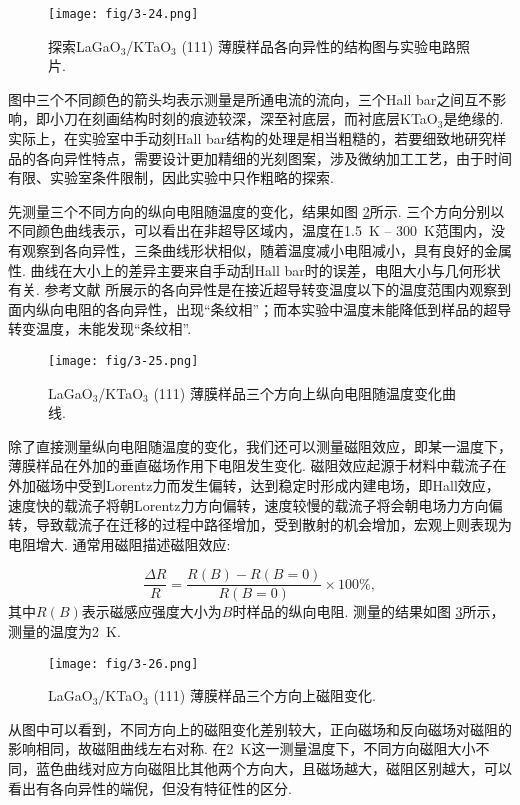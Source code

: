 \documentclass[12pt,a4paper,openany,twoside,UTF-8]{book}
\begin{document}
\begin{figure}[htbp]
\centering
\texttt{[image: fig/3-24.png]}
\caption{探索LaGaO$_3$/KTaO$_3$ (111) 薄膜样品各向异性的结构图与实验电路照片.}
\label{fig:3-24} 
\end{figure}

图中三个不同颜色的箭头均表示测量是所通电流的流向，三个Hall bar之间互不影响，即小刀在刻画结构时刻的痕迹较深，深至衬底层，而衬底层KTaO$_3$是绝缘的. 实际上，在实验室中手动刻Hall bar结构的处理是相当粗糙的，若要细致地研究样品的各向异性特点，需要设计更加精细的光刻图案，涉及微纳加工工艺，由于时间有限、实验室条件限制，因此实验中只作粗略的探索.

先测量三个不同方向的纵向电阻随温度的变化，结果如图 \ref{fig:3-25}所示. 三个方向分别以不同颜色曲线表示，可以看出在非超导区域内，温度在\SI{1.5}{K} – \SI{300}{K}范围内，没有观察到各向异性，三条曲线形状相似，随着温度减小电阻减小，具有良好的金属性. 曲线在大小上的差异主要来自手动刮Hall bar时的误差，电阻大小与几何形状有关. 参考文献 \cite{ref22}所展示的各向异性是在接近超导转变温度以下的温度范围内观察到面内纵向电阻的各向异性，出现“条纹相”；而本实验中温度未能降低到样品的超导转变温度，未能发现“条纹相”.

\begin{figure}[htbp]
\centering
\texttt{[image: fig/3-25.png]}
\caption{LaGaO$_3$/KTaO$_3$ (111) 薄膜样品三个方向上纵向电阻随温度变化曲线.}
\label{fig:3-25} 
\end{figure}

除了直接测量纵向电阻随温度的变化，我们还可以测量磁阻效应，即某一温度下，薄膜样品在外加的垂直磁场作用下电阻发生变化. 磁阻效应起源于材料中载流子在外加磁场中受到Lorentz力而发生偏转，达到稳定时形成内建电场，即Hall效应，速度快的载流子将朝Lorentz力方向偏转，速度较慢的载流子将会朝电场力方向偏转，导致载流子在迁移的过程中路径增加，受到散射的机会增加，宏观上则表现为电阻增大. 通常用磁阻描述磁阻效应:

\begin{equation}
\frac{\Delta R}{R}=\frac{R(B)-R(B=0)}{R(B=0)}\times100\%,
\label{eq:3-1}
\end{equation}
其中$R(B)$表示磁感应强度大小为$B$时样品的纵向电阻. 测量的结果如图 \ref{fig:3-26}所示，测量的温度为\SI{2}{K}.

\begin{figure}[htbp]
\centering
\texttt{[image: fig/3-26.png]}
\caption{LaGaO$_3$/KTaO$_3$ (111) 薄膜样品三个方向上磁阻变化.}
\label{fig:3-26} 
\end{figure}

从图中可以看到，不同方向上的磁阻变化差别较大，正向磁场和反向磁场对磁阻的影响相同，故磁阻曲线左右对称. 在\SI{2}{K}这一测量温度下，不同方向磁阻大小不同，蓝色曲线对应方向磁阻比其他两个方向大，且磁场越大，磁阻区别越大，可以看出有各向异性的端倪，但没有特征性的区分. 
\end{document}
